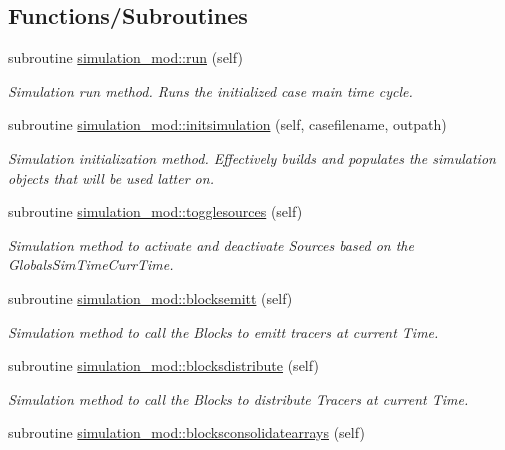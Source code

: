 \subsection*{Functions/\+Subroutines}
\begin{DoxyCompactItemize}
\item 
subroutine \mbox{\hyperlink{namespacesimulation__mod_a73bd78c4ac76c51f1e10f5847c25c4df}{simulation\+\_\+mod\+::run}} (self)
\begin{DoxyCompactList}\small\item\em Simulation run method. Runs the initialized case main time cycle. \end{DoxyCompactList}\item 
subroutine \mbox{\hyperlink{namespacesimulation__mod_aedbba2bb458cbcd7eb93938a5f7b5940}{simulation\+\_\+mod\+::initsimulation}} (self, casefilename, outpath)
\begin{DoxyCompactList}\small\item\em Simulation initialization method. Effectively builds and populates the simulation objects that will be used latter on. \end{DoxyCompactList}\item 
subroutine \mbox{\hyperlink{namespacesimulation__mod_a87a5141e4516b9610a6e4f0d2ff2d719}{simulation\+\_\+mod\+::togglesources}} (self)
\begin{DoxyCompactList}\small\item\em Simulation method to activate and deactivate Sources based on the GlobalsSim\+TimeCurr\+Time. \end{DoxyCompactList}\item 
subroutine \mbox{\hyperlink{namespacesimulation__mod_a13aa0745f4601e3f418143dab2f18276}{simulation\+\_\+mod\+::blocksemitt}} (self)
\begin{DoxyCompactList}\small\item\em Simulation method to call the Blocks to emitt tracers at current Time. \end{DoxyCompactList}\item 
subroutine \mbox{\hyperlink{namespacesimulation__mod_a058892630af07fc0fe8a4bffec531c6a}{simulation\+\_\+mod\+::blocksdistribute}} (self)
\begin{DoxyCompactList}\small\item\em Simulation method to call the Blocks to distribute Tracers at current Time. \end{DoxyCompactList}\item 
subroutine \mbox{\hyperlink{namespacesimulation__mod_ac838d4afe33303dc49a5790ca957baa1}{simulation\+\_\+mod\+::blocksconsolidatearrays}} (self)

\end{DoxyCompactItemize}
